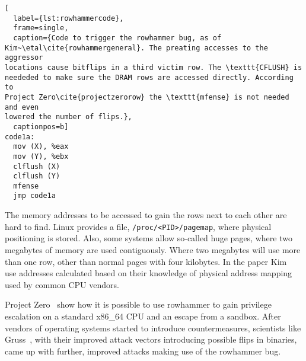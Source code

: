 \begin{minipage}{\linewidth}
\begin{lstlisting}[
  label={lst:rowhammercode},
  frame=single,
  caption={Code to trigger the rowhammer bug, as of
Kim~\etal\cite{rowhammergeneral}. The preating accesses to the aggressor
locations cause bitflips in a third victim row. The \texttt{CFLUSH} is
neededed to make sure the DRAM rows are accessed directly. According to
Project Zero\cite{projectzerorow} the \texttt{mfense} is not needed and even
lowered the number of flips.},
  captionpos=b]
code1a:
  mov (X), %eax
  mov (Y), %ebx
  clflush (X)
  clflush (Y)
  mfense
  jmp code1a
\end{lstlisting}
\end{minipage}

The memory addresses to be accessed to gain the rows next to each other are hard
to find. Linux provides a file, \texttt{/proc/<PID>/pagemap}, where physical
positioning is stored. Also, some systems allow so-called huge pages, where two
megabytes of memory are used contiguously. Where two megabytes will use more
than one row, other than normal pages with four kilobytes. In the paper
Kim~\etal\cite{rowhammergeneral} use addresses calculated based on their
knowledge of physical address mapping used by common CPU vendors.

Project Zero~\cite{projectzerorow} show how it is possible to use rowhammer to
gain privilege escalation on a standard x86\_64 CPU and an escape from a
sandbox. After vendors of operating systems started to introduce
countermeasures, scientists like Gruss~\etal\cite{rowhammerjs}, with their
improved attack vectors introducing possible flips in binaries, came up with
further, improved attacks making use of the rowhammer bug.

